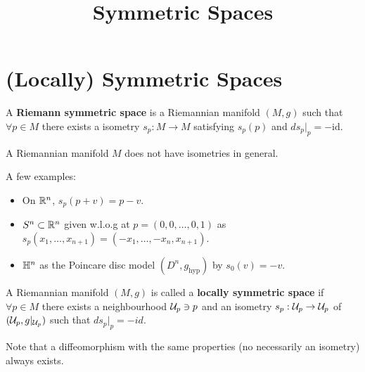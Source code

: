 \documentclass[10pt,a4paper]{article}
\title{Symmetric Spaces}
\date{}
\begin{document}
\maketitle	
\section{(Locally) Symmetric Spaces}
\begin{defn}
A \textbf{Riemann symmetric space} is a Riemannian manifold $(M,g)$ such that $\forall p\in M$ there exists a isometry $s_p: M\to M$ satisfying $s_p(p)$ and $ds_p\vert_p = -\text{id}$.
\end{defn}

\begin{remark}
A Riemannian manifold $M$ does not have isometries in general.
\end{remark}

A few examples:

\begin{example}
\begin{itemize}
\item On $\mathbb{R}^n$, $s_p(p+v) = p-v$.
\item $S^n\subset \mathbb{R}^n$ given w.l.o.g at $p=(0,0,\ldots,0,1)$ as $s_p(x_1,\ldots,x_{n+1}) = (-x_1,\ldots,-x_n,x_{n+1})$.
\item $\mathbb{H}^n$ as the Poincare disc model $(D^n,g_{\text{hyp}})$ by $s_0(v) = -v$.
\end{itemize}
\end{example}

\begin{defn}
A Riemannian manifold $(M,g)$ is called a \textbf{locally symmetric space} if $\forall p\in M$ there exists a neighbourhood $\mathcal{U}_p\ni p$ and an isometry $s_p:\mathcal{U}_p\to \mathcal{U}_p$ of $(\mathcal{U}_p,g\vert_{\mathcal{U}_p})$ such that $ds_p\vert_p = -id$.
\end{defn}
Note that a diffeomorphism with the same properties (no necessarily an isometry) always exists.
\end{document}
